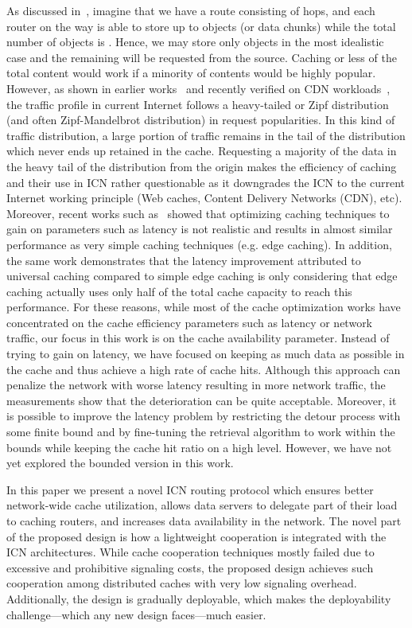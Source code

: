 \documentclass[article]{elsarticle}
\begin{document}
As discussed in~\cite{hotnets2011}, imagine that we have a route consisting of  hops, and each router on the way is able to store up to  objects (or data chunks) while the total number of objects is . Hence, we may store only  objects in the most idealistic case and the remaining will be requested from the source. Caching  or less of the total content would work if a minority of contents would be highly popular. However, as shown in earlier works~\cite{kazaa, gill2007youtube} and recently verified on CDN workloads~\cite{fayazbakhsh2013less}, the traffic profile in current Internet follows a heavy-tailed or Zipf distribution (and often Zipf-Mandelbrot distribution) in request popularities. In this kind of traffic distribution, a large portion of traffic remains in the tail of the distribution which never ends up retained in the cache. Requesting a majority of the data in the heavy tail of the distribution from the origin makes the efficiency of caching and their use in ICN rather questionable as it downgrades the ICN to the current Internet working principle (Web caches, Content Delivery Networks (CDN), etc). Moreover, recent works such as~\cite{fayazbakhsh2013less} showed that optimizing caching techniques to gain on parameters such as latency is not realistic and results in almost similar performance as very simple caching techniques (e.g. edge caching). In addition, the same work demonstrates that the latency improvement attributed to universal caching compared to simple edge caching is only  considering that edge caching actually uses only half of the total cache capacity to reach this performance. For these reasons, while most of the cache optimization works have concentrated on the cache efficiency parameters such as latency or network traffic, our focus in this work is on the cache availability parameter. Instead of trying to gain on latency, we have focused on keeping as much data as possible in the cache and thus achieve a high rate of cache hits. Although this approach can penalize the network with worse latency resulting in more network traffic, the measurements show that the deterioration can be quite acceptable. Moreover, it is possible to improve the latency problem by restricting the detour process with some finite bound and by fine-tuning the retrieval algorithm to work within the bounds while keeping the cache hit ratio on a high level. However, we have not yet explored the bounded version in this work. 

In this paper we present a novel ICN routing protocol which ensures better network-wide cache utilization, allows data servers to delegate part of their load to caching routers, and increases data availability in the network. The novel part of the proposed design is how a lightweight cooperation is integrated with the ICN architectures. While cache cooperation techniques mostly failed due to excessive and prohibitive signaling costs, the proposed design achieves such cooperation among distributed caches with very low signaling overhead. Additionally, the design is gradually deployable, which makes the deployability challenge---which any new design faces---much easier. 
\end{document}
